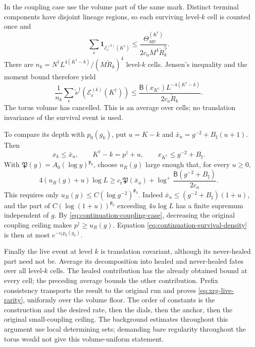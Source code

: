 \documentclass[11pt,letterpaper,reqno]{amsart}
\theoremstyle{definition}
\theoremstyle{remark}
\begin{document}
In the coupling case use the volume part of the same mark.
Distinct terminal components have disjoint lineage regions,
so each surviving level-\(k\) cell is counted once and
\[
 \sum_{\mathfrak c}
       \mathbf1_{\mathcal E_{\mathfrak c}^{(k)}(K^\dagger)}
 \le
 \frac{\Theta_{\mathrm{age}}^{(K^\dagger)}}
                           {2c_aM^4\check R_k^5}.
\]
There are
\(n_k=N^\dagger L^{4(K^\dagger-k)}/(M\check R_k)^4\)
level-\(k\) cells. Jensen's inequality and the moment bound
therefore yield
\begin{equation}\label{eq:continuation-survival-density}
 \frac1{n_k}\sum_{\mathfrak c}
       \widetilde\nu^\dagger
           (\mathcal E_{\mathfrak c}^{(k)}(K^\dagger))
 \le
 \frac{\mathsf B(x_{K^\dagger})
                         L^{-4(K^\dagger-k)}}{2c_a\check R_k}.
\end{equation}
The torus volume has cancelled. This is an average over cells;
no translation invariance of the survival event is used.

To compare its depth with \(p_0(g_k)\), put \(u=K-k\) and
\(\bar x_u=g^{-2}+B_\sharp(u+1)\). Then
\[
 x_k\le\bar x_u,\qquad
 K^\dagger-k=p^\dagger+u,\qquad
 x_{K^\dagger}\le g^{-2}+B_\sharp.
\]
With \(\mathfrak P(y)=A_0(\log y)^{\mathfrak p_0}\), choose
\(u_R(g)\) large enough that, for every \(u\ge0\),
\[
 4(u_R(g)+u)\log L
 \ge c_{\mathrm r}\mathfrak P(\bar x_u)
            +\log^+\frac{\mathsf B(g^{-2}+B_\sharp)}{2c_a}.
\]
This requires only \(u_R(g)\le C(\log g^{-2})^{\mathfrak p_0}\).
Indeed \(\bar x_u\le(g^{-2}+B_\sharp)(1+u)\), and the
part of \(C(\log(1+u))^{\mathfrak p_0}\) exceeding
\(4u\log L\) has a finite supremum independent of \(g\).
By \eqref{eq:continuation-coupling-case}, decreasing the
original coupling ceiling makes \(p^\dagger\ge u_R(g)\).
Equation \eqref{eq:continuation-survival-density} is then
at most \(e^{-c_{\mathrm r}p_0(g_k)}\).

Finally the live event at level \(k\) is translation
covariant, although its never-healed part need not be.
Average its decomposition into healed and never-healed
fates over all level-\(k\) cells. The healed contribution
has the already obtained bound at every cell; the preceding
average bounds the other contribution. Prefix consistency
transports the result to the original run and proves
\eqref{eq:xrg-live-rarity}, uniformly over the volume floor.
The order of constants is the construction and the desired
rate, then the dials, then the anchor, then the original
small-coupling ceiling. The background estimates throughout
this argument use local determining sets; demanding bare
regularity throughout the torus would not give this
volume-uniform statement.
\end{document}
